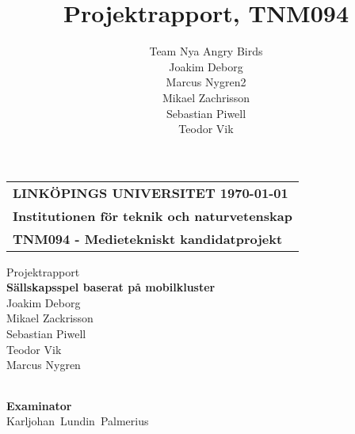 \documentclass[a4paper,12pt,oneside,final]{extbook}
\author{Team Nya Angry Birds\\Joakim Deborg\\Marcus Nygren2\\Mikael Zachrisson\\Sebastian Piwell\\Teodor Vik}
\title{Projektrapport, TNM094}
\begin{document}
\pagestyle{empty}
\thispagestyle{empty}

\frontmatter

\def\inst{teknik och naturvetenskap}
\def\typeofdoc{TNM094 - Medietekniskt kandidatprojekt}

\def\subject{Sällskapsspel baserat på mobilkluster}
\def\pretitle{Projektrapport}
\def\auhor{Joakim Deborg \\ Mikael Zackrisson \\
Sebastian Piwell \\
Teodor Vik \\
Marcus Nygren}


\def\colleagues{\\ Mikael Zackrisson \\
Sebastian Piwell \\
Teodor Vik \\
Marcus Nygren}
\def\username{joade361}
\def\email{\username{}@Student.liu.se}
\def\path{edu/KURS/lab1}
\def\graders{Karljohan Lundin Palmerius}

\begin{titlepage}
		\thispagestyle{empty}
		\begin{large}
			\begin{tabular}{@{}p{\textwidth}@{}}
				\textbf{LINKÖPINGS UNIVERSITET \hfill \today} \\
				\textbf{Institutionen för \inst} \\
				\textbf{\typeofdoc} \\
			\end{tabular}
		\end{large}
		\vspace{70mm}
		\begin{center}
			\LARGE{\pretitle} \\
			\huge{\textbf{\subject}}\\
			\vspace{10mm}
			\LARGE{\auhor} \\
			\vspace{35mm}
			\begin{large}
				\begin{tabular}{ll}
				\end{tabular}
			\end{large}
			\vfill
			\large{\textbf{Examinator}}\\
			\mbox{\large{\graders}}
		\end{center}
	\end{titlepage}
	
\end{document}
